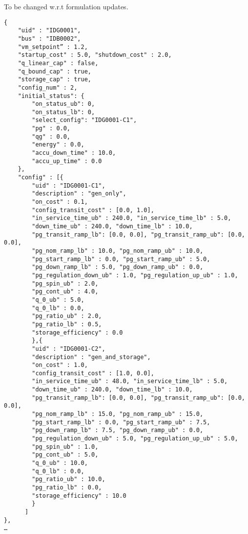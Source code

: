 \begin{todo}[]{}
To be changed w.r.t formulation updates. 
\end{todo}
\begin{verbatim}
{
    "uid" : "IDG0001",
    "bus" : "IDB0002",
    "vm_setpoint” : 1.2,
    "startup_cost" : 5.0, "shutdown_cost" : 2.0,
    "q_linear_cap" : false, 
    "q_bound_cap" : true, 
    "storage_cap" : true,
    "config_num" : 2,
    "initial_status": {
        "on_status_ub": 0,
        "on_status_lb": 0,
        "select_config": "IDG0001-C1",
        "pg" : 0.0,
        "qg" : 0.0,
        "energy" : 0.0,
        "accu_down_time" : 10.0,
        "accu_up_time" : 0.0
    },
    "config" : [{
        "uid" : "IDG0001-C1",
        "description" : "gen_only",
        "on_cost" : 0.1,
        "config_transit_cost" : [0.0, 1.0],
        "in_service_time_ub" : 240.0, "in_service_time_lb" : 5.0,
        "down_time_ub" : 240.0, "down_time_lb" : 10.0,
        "pg_transit_ramp_lb": [0.0, 0.0], "pg_transit_ramp_ub": [0.0, 0.0],
        "pg_nom_ramp_lb" : 10.0, "pg_nom_ramp_ub" : 10.0,
        "pg_start_ramp_lb" : 0.0, "pg_start_ramp_ub" : 5.0,
        "pg_down_ramp_lb" : 5.0, "pg_down_ramp_ub" : 0.0,
        "pg_regulation_down_ub" : 1.0, "pg_regulation_up_ub" : 1.0,
        "pg_spin_ub" : 2.0, 
        "pg_cont_ub" : 4.0, 
        "q_0_ub" : 5.0,
        "q_0_lb" : 0.0,
        "pg_ratio_ub" : 2.0,
        "pg_ratio_lb" : 0.5,
        "storage_efficiency" : 0.0
        },{
        "uid" : "IDG0001-C2",
        "description" : "gen_and_storage",
        "on_cost" : 1.0,
        "config_transit_cost" : [1.0, 0.0],
        "in_service_time_ub" : 48.0, "in_service_time_lb" : 5.0,
        "down_time_ub" : 240.0, "down_time_lb" : 10.0,
        "pg_transit_ramp_lb": [0.0, 0.0], "pg_transit_ramp_ub": [0.0, 0.0],
        "pg_nom_ramp_lb" : 15.0, "pg_nom_ramp_ub" : 15.0,
        "pg_start_ramp_lb" : 0.0, "pg_start_ramp_ub" : 7.5,
        "pg_down_ramp_lb" : 7.5, "pg_down_ramp_ub" : 0.0,
        "pg_regulation_down_ub" : 5.0, "pg_regulation_up_ub" : 5.0,
        "pg_spin_ub" : 1.0, 
        "pg_cont_ub" : 5.0, 
        "q_0_ub" : 10.0,
        "q_0_lb" : 0.0,
        "pg_ratio_ub" : 10.0,
        "pg_ratio_lb" : 0.0,
        "storage_efficiency" : 10.0
        }
      ]    
},
…     
\end{verbatim}


